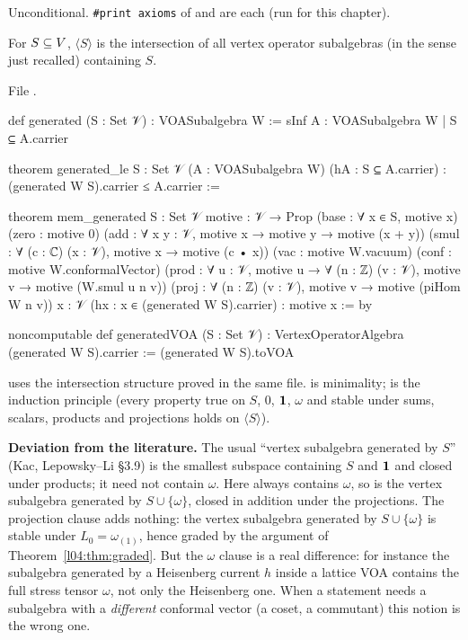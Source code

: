 \begin{status}
Unconditional. \texttt{\#print axioms} of  and 
are each \lean{[propext, Classical.}\allowbreak{}\allowbreak\lean{sound]} (run for this chapter).
\end{status}

\begin{definition}\label{l04:def:generated}
For $S\subseteq V$, $\langle S\rangle$ is the intersection of all vertex operator subalgebras
(in the sense just recalled) containing $S$.
\end{definition}
\noindent File .
\begin{leancode}
def generated (S : Set 𝒱) : VOASubalgebra W :=
  sInf {A : VOASubalgebra W | S ⊆ A.carrier}

theorem generated_le {S : Set 𝒱} (A : VOASubalgebra W) (hA : S ⊆ A.carrier) :
    (generated W S).carrier ≤ A.carrier :=

theorem mem_generated {S : Set 𝒱} {motive : 𝒱 → Prop}
    (base : ∀ x ∈ S, motive x)
    (zero : motive 0)
    (add : ∀ x y : 𝒱, motive x → motive y → motive (x + y))
    (smul : ∀ (c : ℂ) (x : 𝒱), motive x → motive (c • x))
    (vac : motive W.vacuum)
    (conf : motive W.conformalVector)
    (prod : ∀ u : 𝒱, motive u → ∀ (n : ℤ) (v : 𝒱), motive v → motive (W.smul u n v))
    (proj : ∀ (n : ℤ) (v : 𝒱), motive v → motive (piHom W n v))
    {x : 𝒱} (hx : x ∈ (generated W S).carrier) : motive x := by

noncomputable def generatedVOA (S : Set 𝒱) :
    VertexOperatorAlgebra (generated W S).carrier :=
  (generated W S).toVOA
\end{leancode}
\begin{dictionary}
 uses the intersection structure  proved in the same file.
 is minimality;  is the induction principle (every property
true on $S$, $0$, $\mathbf{1}$, $\omega$ and stable under sums, scalars, products and projections holds on
$\langle S\rangle$).

\textbf{Deviation from the literature.} The usual ``vertex subalgebra generated by $S$'' (Kac,
Lepowsky--Li §3.9) is the smallest subspace containing $S$ and $\mathbf{1}$ and closed under products; it
need not contain $\omega$. Here  always contains $\omega$, so 
is the vertex subalgebra generated by $S\cup\{\omega\}$, closed in addition under the projections.
The projection clause adds nothing: the vertex subalgebra generated by $S\cup\{\omega\}$ is stable
under $L_0 = \omega_{(1)}$, hence graded by the argument of Theorem~\ref{l04:thm:graded}. But the
$\omega$ clause is a real difference: for instance the subalgebra generated by a Heisenberg current $h$
inside a lattice VOA contains the full stress tensor $\omega$, not only the Heisenberg one. When a
statement needs a subalgebra with a \emph{different} conformal vector (a coset, a commutant) this
notion is the wrong one.
\end{dictionary}
